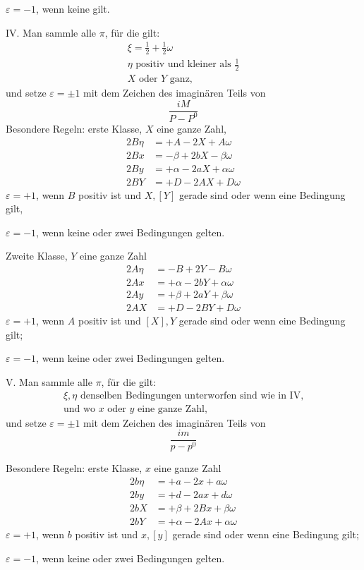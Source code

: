 $\varepsilon=-1$, wenn keine gilt.

\clearpage
{}
IV. Man sammle alle $\pi$, für die gilt:
\[
\begin{array}{l}
\xi=\frac12+\frac12\omega\\
\eta\text{ positiv und kleiner als }\frac12\\
X\text{ oder }Y\text{ ganz,}
\end{array}
\]
und setze $\varepsilon=\pm1$ mit dem Zeichen des imaginären Teils von
\[
\frac{iM}{P-P^0}
\]
Besondere Regeln: erste Klasse, $X$ eine ganze Zahl,
\[
\begin{aligned}
2B\eta&=+A-2X+A\omega\\
2Bx&=-\beta+2bX-\beta\omega\\
2By&=+\alpha-2aX+\alpha\omega\\
2BY&=+D-2AX+D\omega
\end{aligned}
\]
$\varepsilon=+1$, wenn $B$ positiv ist und $X,[Y]$ gerade sind oder wenn eine Bedingung gilt,

$\varepsilon=-1$, wenn keine oder zwei Bedingungen gelten.

Zweite Klasse, $Y$ eine ganze Zahl
\[
\begin{aligned}
2A\eta&=-B+2Y-B\omega\\
2Ax&=+\alpha-2bY+\alpha\omega\\
2Ay&=+\beta+2aY+\beta\omega\\
2AX&=+D-2BY+D\omega
\end{aligned}
\]
\noindent $\varepsilon=+1$, wenn $A$ positiv ist und $[X],Y$ gerade sind oder wenn eine Bedingung gilt;\par
\noindent $\varepsilon=-1$, wenn keine oder zwei Bedingungen gelten.

\clearpage
{}
V. Man sammle alle $\pi$, für die gilt:
\[
\begin{gathered}
\xi,\eta\text{ denselben Bedingungen unterworfen sind wie in IV,}\\
\text{und wo }x\text{ oder }y\text{ eine ganze Zahl,}
\end{gathered}
\]
und setze $\varepsilon=\pm1$ mit dem Zeichen des imaginären Teils von
\[
\frac{im}{p-p^0}
\]

Besondere Regeln: erste Klasse, $x$ eine ganze Zahl
\[
\begin{aligned}
2b\eta&=+a-2x+a\omega\\
2by&=+d-2ax+d\omega\\
2bX&=+\beta+2Bx+\beta\omega\\
2bY&=+\alpha-2Ax+\alpha\omega
\end{aligned}
\]
\noindent $\varepsilon=+1$, wenn $b$ positiv ist und $x,[y]$ gerade sind oder wenn eine Bedingung gilt;\par
\noindent $\varepsilon=-1$, wenn keine oder zwei Bedingungen gelten.

